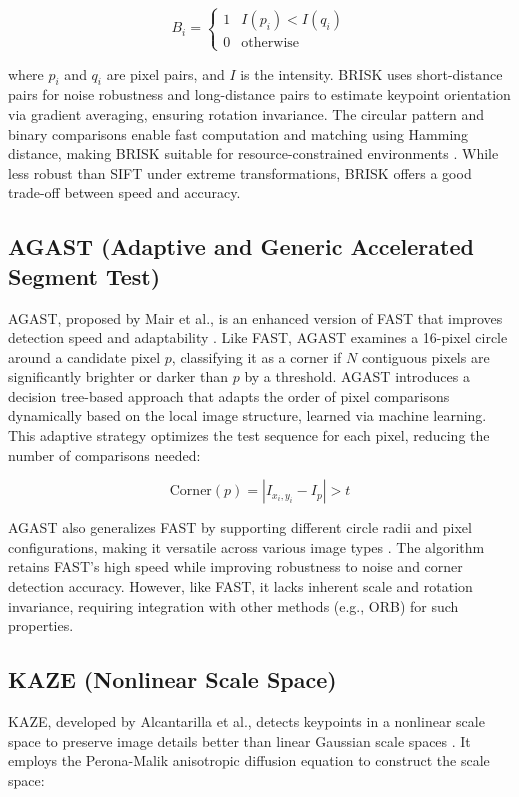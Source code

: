 \documentclass[journal]{IEEEtran}
\begin{document}
\begin{equation}
B_i = \begin{cases} 1 & I(p_i) < I(q_i) \\ 0 & \text{otherwise} \end{cases}
\end{equation}

where \( p_i \) and \( q_i \) are pixel pairs, and \( I \) is the intensity. BRISK uses short-distance pairs for noise robustness and long-distance pairs to estimate keypoint orientation via gradient averaging, ensuring rotation invariance. The circular pattern and binary comparisons enable fast computation and matching using Hamming distance, making BRISK suitable for resource-constrained environments \cite{BRISK}. While less robust than SIFT under extreme transformations, BRISK offers a good trade-off between speed and accuracy.

\subsection{AGAST (Adaptive and Generic Accelerated Segment Test)}
AGAST, proposed by Mair et al., is an enhanced version of FAST that improves detection speed and adaptability \cite{AGAST}. Like FAST, AGAST examines a 16-pixel circle around a candidate pixel \( p \), classifying it as a corner if \( N \) contiguous pixels are significantly brighter or darker than \( p \) by a threshold. AGAST introduces a decision tree-based approach that adapts the order of pixel comparisons dynamically based on the local image structure, learned via machine learning. This adaptive strategy optimizes the test sequence for each pixel, reducing the number of comparisons needed:

\begin{equation}
\text{Corner}(p) = \left| I_{x_i, y_i} - I_p \right| > t
\end{equation}

AGAST also generalizes FAST by supporting different circle radii and pixel configurations, making it versatile across various image types \cite{AGAST}. The algorithm retains FAST’s high speed while improving robustness to noise and corner detection accuracy. However, like FAST, it lacks inherent scale and rotation invariance, requiring integration with other methods (e.g., ORB) for such properties.

\subsection{KAZE (Nonlinear Scale Space)}
KAZE, developed by Alcantarilla et al., detects keypoints in a nonlinear scale space to preserve image details better than linear Gaussian scale spaces \cite{KAZE}. It employs the Perona-Malik anisotropic diffusion equation to construct the scale space:
\end{document}
